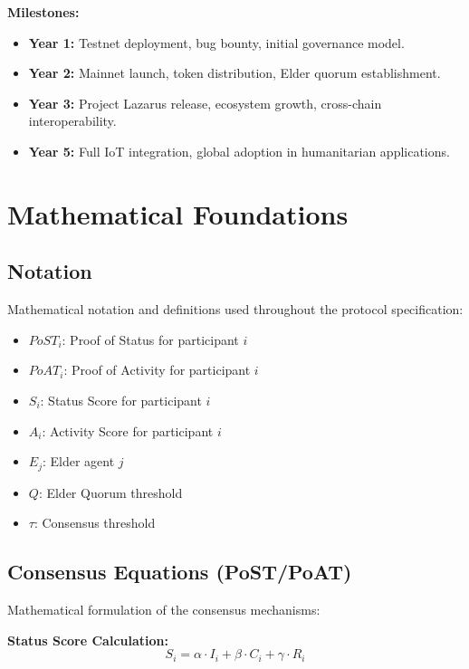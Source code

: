\documentclass[11pt,a4paper]{article}
\begin{document}
\textbf{Milestones:}
\begin{itemize}
    \item \textbf{Year 1:} Testnet deployment, bug bounty, initial governance model.
    \item \textbf{Year 2:} Mainnet launch, token distribution, Elder quorum establishment.
    \item \textbf{Year 3:} Project Lazarus release, ecosystem growth, cross-chain interoperability.
    \item \textbf{Year 5:} Full IoT integration, global adoption in humanitarian applications.
\end{itemize}


\section{Mathematical Foundations}

\subsection{Notation}
Mathematical notation and definitions used throughout the protocol specification:
\begin{itemize}
    \item $PoST_i$: Proof of Status for participant $i$
    \item $PoAT_i$: Proof of Activity for participant $i$
    \item $S_i$: Status Score for participant $i$
    \item $A_i$: Activity Score for participant $i$
    \item $E_j$: Elder agent $j$
    \item $Q$: Elder Quorum threshold
    \item $\tau$: Consensus threshold
\end{itemize}

\subsection{Consensus Equations (PoST/PoAT)}
Mathematical formulation of the consensus mechanisms:

\textbf{Status Score Calculation:}
$$S_i = \alpha \cdot I_i + \beta \cdot C_i + \gamma \cdot R_i$$
\end{document}
